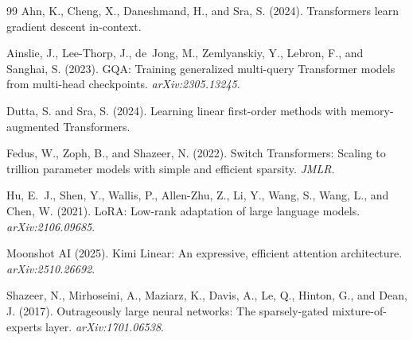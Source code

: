 \documentclass[10pt,twocolumn]{article}
\begin{document}
\begin{thebibliography}{99}
Ahn, K., Cheng, X., Daneshmand, H., and Sra, S. (2024). Transformers learn gradient descent in-context.

Ainslie, J., Lee-Thorp, J., de~Jong, M., Zemlyanskiy, Y., Lebron, F., and Sanghai, S. (2023). GQA: Training generalized multi-query Transformer models from multi-head checkpoints. \emph{arXiv:2305.13245}.

Dutta, S. and Sra, S. (2024). Learning linear first-order methods with memory-augmented Transformers.

Fedus, W., Zoph, B., and Shazeer, N. (2022). Switch Transformers: Scaling to trillion parameter models with simple and efficient sparsity. \emph{JMLR}.

Hu, E.~J., Shen, Y., Wallis, P., Allen-Zhu, Z., Li, Y., Wang, S., Wang, L., and Chen, W. (2021). LoRA: Low-rank adaptation of large language models. \emph{arXiv:2106.09685}.

Moonshot AI (2025). Kimi Linear: An expressive, efficient attention architecture. \emph{arXiv:2510.26692}.

Shazeer, N., Mirhoseini, A., Maziarz, K., Davis, A., Le, Q., Hinton, G., and Dean, J. (2017). Outrageously large neural networks: The sparsely-gated mixture-of-experts layer. \emph{arXiv:1701.06538}.
\end{thebibliography}
\end{document}
